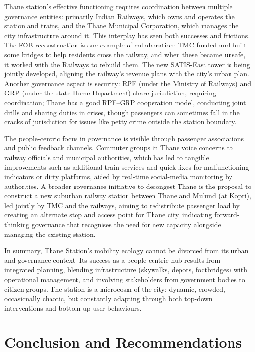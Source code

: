 \documentclass[11pt]{article}
\begin{document}
Thane station's effective functioning requires coordination between multiple governance
entities: primarily Indian Railways, which owns and operates the station and trains, and the
Thane Municipal Corporation, which manages the city infrastructure around it. This interplay has
seen both successes and frictions. The FOB reconstruction is one example of collaboration: TMC
funded and built some bridges to help residents cross the railway, and when these became unsafe,
it worked with the Railways to rebuild them. The new SATIS-East tower is being jointly developed,
aligning the railway's revenue plans with the city's urban plan. Another governance aspect is
security: RPF (under the Ministry of Railways) and GRP (under the state Home Department) share
jurisdiction, requiring coordination; Thane has a good RPF--GRP cooperation model, conducting
joint drills and sharing duties in crises, though passengers can sometimes fall in the cracks of
jurisdiction for issues like petty crime outside the station boundary.

The people-centric focus in governance is visible through passenger associations and public
feedback channels. Commuter groups in Thane voice concerns to railway officials and municipal
authorities, which has led to tangible improvements such as additional train services and quick
fixes for malfunctioning indicators or dirty platforms, aided by real-time social-media
monitoring by authorities. A broader governance initiative to decongest Thane is the proposal to
construct a new suburban railway station between Thane and Mulund (at Kopri), led jointly by TMC
and the railways, aiming to redistribute passenger load by creating an alternate stop and access
point for Thane city, indicating forward-thinking governance that recognises the need for new
capacity alongside managing the existing station.

In summary, Thane Station's mobility ecology cannot be divorced from its urban and governance
context. Its success as a people-centric hub results from integrated planning, blending
infrastructure (skywalks, depots, footbridges) with operational management, and involving
stakeholders from government bodies to citizen groups. The station is a microcosm of the city:
dynamic, crowded, occasionally chaotic, but constantly adapting through both top-down
interventions and bottom-up user behaviours.

\section{Conclusion and Recommendations}
\end{document}
